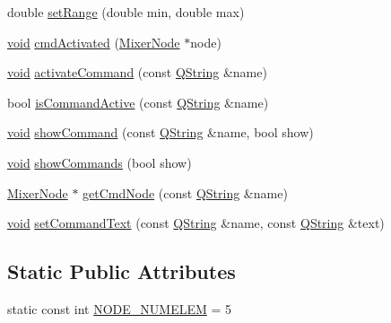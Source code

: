 \begin{DoxyCompactItemize}
\item 
double \hyperlink{group___u_a_v_object_widget_utils_ga282a2d6417e079ff34450ffb620f9898}{set\-Range} (double min, double max)
\item 
\hyperlink{group___u_a_v_objects_plugin_ga444cf2ff3f0ecbe028adce838d373f5c}{void} \hyperlink{group___u_a_v_object_widget_utils_ga1846362502f57645af53b826ee5537ad}{cmd\-Activated} (\hyperlink{class_mixer_node}{\-Mixer\-Node} $\ast$node)
\item 
\hyperlink{group___u_a_v_objects_plugin_ga444cf2ff3f0ecbe028adce838d373f5c}{void} \hyperlink{group___u_a_v_object_widget_utils_gad39c4c8427b031af1e9042f750301ec8}{activate\-Command} (const \hyperlink{group___u_a_v_objects_plugin_gab9d252f49c333c94a72f97ce3105a32d}{\-Q\-String} \&name)
\item 
bool \hyperlink{group___u_a_v_object_widget_utils_ga3922cc5ec0cc7ce3937fbbd2199c1170}{is\-Command\-Active} (const \hyperlink{group___u_a_v_objects_plugin_gab9d252f49c333c94a72f97ce3105a32d}{\-Q\-String} \&name)
\item 
\hyperlink{group___u_a_v_objects_plugin_ga444cf2ff3f0ecbe028adce838d373f5c}{void} \hyperlink{group___u_a_v_object_widget_utils_gab84993af05bfcca9d61a15a48ff85a73}{show\-Command} (const \hyperlink{group___u_a_v_objects_plugin_gab9d252f49c333c94a72f97ce3105a32d}{\-Q\-String} \&name, bool show)
\item 
\hyperlink{group___u_a_v_objects_plugin_ga444cf2ff3f0ecbe028adce838d373f5c}{void} \hyperlink{group___u_a_v_object_widget_utils_ga29668291c080a26aa2631f3216755094}{show\-Commands} (bool show)
\item 
\hyperlink{class_mixer_node}{\-Mixer\-Node} $\ast$ \hyperlink{group___u_a_v_object_widget_utils_ga2c1fc49cc5fe0c0b20163b8249d9fabf}{get\-Cmd\-Node} (const \hyperlink{group___u_a_v_objects_plugin_gab9d252f49c333c94a72f97ce3105a32d}{\-Q\-String} \&name)
\item 
\hyperlink{group___u_a_v_objects_plugin_ga444cf2ff3f0ecbe028adce838d373f5c}{void} \hyperlink{group___u_a_v_object_widget_utils_gaa3ea4c7117915989815218e35875c190}{set\-Command\-Text} (const \hyperlink{group___u_a_v_objects_plugin_gab9d252f49c333c94a72f97ce3105a32d}{\-Q\-String} \&name, const \hyperlink{group___u_a_v_objects_plugin_gab9d252f49c333c94a72f97ce3105a32d}{\-Q\-String} \&text)
\end{DoxyCompactItemize}
\subsection*{\-Static \-Public \-Attributes}
\begin{DoxyCompactItemize}
\item 
static const int \hyperlink{group___u_a_v_object_widget_utils_ga359d5a2efb6966cba1d78bbdb2e7759d}{\-N\-O\-D\-E\-\_\-\-N\-U\-M\-E\-L\-E\-M} = 5
\end{DoxyCompactItemize}
